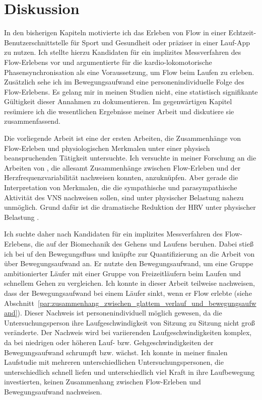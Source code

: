 \chapter{Diskussion}
\label{cha:diskussion}
In den bisherigen Kapiteln motivierte ich das Erleben von Flow in einer Echtzeit-Benutzerschnittstelle für Sport und Gesundheit oder präziser in einer Lauf-App zu nutzen. Ich stellte hierzu Kandidaten für ein implizites Messverfahren des Flow-Erlebens vor und argumentierte für die kardio-lokomotorische Phasensynchronisation als eine Voraussetzung, um Flow beim Laufen zu erleben. Zusätzlich sehe ich im Bewegungsaufwand eine personenindividuelle Folge des Flow-Erlebens. Es gelang mir in meinen Studien nicht, eine statistisch signifikante Gültigkeit dieser Annahmen zu dokumentieren. Im gegenwärtigen Kapitel resümiere ich die wesentlichen Ergebnisse meiner Arbeit und diskutiere sie zusammenfassend. 

Die vorliegende Arbeit ist eine der ersten Arbeiten, die Zusammenhänge von Flow-Erleben und physiologischen Merkmalen unter einer physisch beanspruchenden Tätigkeit untersuchte. Ich versuchte in meiner Forschung an die Arbeiten von \citet{deManzano2010, Keller2011, Gaggioli2013, Peifer2014, Tozman2015}, die allesamt Zusammenhänge zwischen Flow-Erleben und der Herzfrequenzvariabilität nachweisen konnten, anzuknüpfen. Aber gerade die Interpretation von Merkmalen, die die sympathische und parasympathische Aktivität des \ac{VNS} nachweisen sollen, sind unter physischer Belastung nahezu unmöglich. Grund dafür ist die dramatische Reduktion der \ac{HRV} unter physischer Belastung \citep[vgl.][]{Hoos2010}. 

Ich suchte daher nach Kandidaten für ein implizites Messverfahren des Flow-Erlebens, die auf der Biomechanik des Gehens und Laufens beruhen. Dabei stieß ich bei \citet[][S.~121]{Meinel2007} uf den Bewegungsfluss und knüpfte zur Quantifizierung an die Arbeit von \citet{Hreljac2000} über Bewegungsaufwand an. Er nutzte den Bewegungsaufwand, um eine Gruppe ambitionierter Läufer mit einer Gruppe von Freizeitläufern beim Laufen und schnellem Gehen zu vergleichen. Ich konnte in dieser Arbeit teilweise nachweisen, dass der Bewegungsaufwand bei einem Läufer sinkt, wenn er Flow erlebte (siehe Abschnitt~\ref{par:zusammenhang_zwischen_glattem_verlauf_und_bewegungsaufwand}). Dieser Nachweis ist personenindividuell möglich gewesen, da die Untersuchungsperson ihre Laufgeschwindigkeit von Sitzung zu Sitzung nicht groß veränderte. Der Nachweis wird bei variierenden Laufgeschwindigkeiten komplex, da bei niedrigen oder höheren Lauf- bzw. Gehgeschwindigkeiten der Bewegungsaufwand schrumpft bzw. wächst. Ich konnte in meiner finalen Laufstudie mit mehreren unterschiedlichen Untersuchungspersonen, die unterschiedlich schnell liefen und unterschiedlich viel Kraft in ihre Laufbewegung investierten, keinen Zusammenhang zwischen Flow-Erleben und Bewegungsaufwand nachweisen. 

